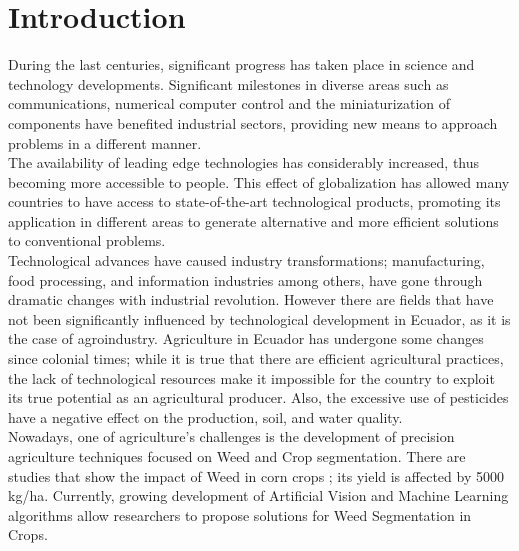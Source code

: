 \documentclass[conference]{IEEEtran}
\begin{document}




%
\IEEEpeerreviewmaketitle

\section{Introduction}
During the last centuries, significant progress has taken place in science and technology developments. Significant milestones in diverse areas such as communications, numerical computer control and the miniaturization of components have benefited industrial sectors, providing new means to approach problems in a different manner. 
\\

The availability of leading edge technologies  has considerably increased, thus becoming more accessible to people. This effect of globalization has allowed many countries to have access to state-of-the-art technological products, promoting its application in different areas to generate alternative and more efficient solutions to conventional problems. 
\\

Technological advances have caused industry transformations; manufacturing, food processing, and information industries among others, have gone through dramatic changes with industrial revolution. However there are fields that have not been significantly influenced by technological development in Ecuador, as it is the case of agroindustry. Agriculture in Ecuador has undergone some changes since colonial times; while it is true that there are efficient agricultural practices, the lack of technological resources make it impossible for the country to exploit its true potential as an agricultural producer. Also, the excessive use of pesticides have a negative effect on the production, soil, and water quality. 
\\

Nowadays, one of agriculture's challenges is the development of precision agriculture techniques focused on Weed and Crop segmentation. There are studies that show the impact of Weed in corn crops \cite{suarez2005distintos}; its yield is affected by 5000 kg/ha. Currently, growing development of Artificial Vision and Machine Learning algorithms allow researchers to propose solutions for Weed Segmentation in Crops. 
\\
\end{document}
